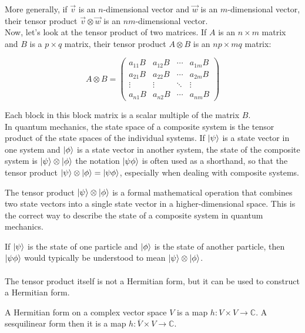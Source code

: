 More generally, if $\vec{v}$ is an $n$-dimensional vector and $\vec{w}$ is an $m$-dimensional vector,
their tensor product $\vec{v} \otimes \vec{w}$ is an $nm$-dimensional vector.
\\

Now, let's look at the tensor product of two matrices.
If $A$ is an $n \times m$ matrix and $B$ is a $p \times q$ matrix,
their tensor product $A \otimes B$ is an $np \times mq$ matrix:

$$
A \otimes B = 
\begin{pmatrix} 
a_{11}B & a_{12}B & \cdots & a_{1m}B \\
a_{21}B & a_{22}B & \cdots & a_{2m}B \\
\vdots & \vdots & \ddots & \vdots \\
a_{n1}B & a_{n2}B & \cdots & a_{nm}B
\end{pmatrix}
$$

Each block in this block matrix is a scalar multiple of the matrix $B$.
\\

In quantum mechanics, the state space of a composite system is
the tensor product of the state spaces of the individual systems.
If $\ket{\psi}$ is a state vector in one system and $\ket{\phi}$ is a state vector in another system,
the state of the composite system is $\ket{\psi} \otimes \ket{\phi}$
the notation $\ket{\psi \phi}$ is often used as a shorthand,
so that the tensor product $\ket{\psi} \otimes \ket{\phi} = \ket{\psi \phi}$,
especially when dealing with composite systems.

The tensor product $\ket{\psi} \otimes \ket{\phi}$ is a formal mathematical operation that combines
two state vectors into a single state vector in a higher-dimensional space.
This is the correct way to describe the state of a composite system in quantum mechanics.

If $\ket{\psi}$ is the state of one particle and $\ket{\phi}$ is the state of
another particle, then $\ket{\psi \phi}$ would typically be understood to mean
$\ket{\psi} \otimes \ket{\phi}$.
\\~\\

The tensor product itself is not a Hermitian form, but it can be used to construct a Hermitian form.

A Hermitian form on a complex vector space $V$ is a map
$h: V \times V \to \mathbb{C}$.
A sesquilinear form then it is a map $h: \overline{V} \times V \to \mathbb{C}$.
\\

